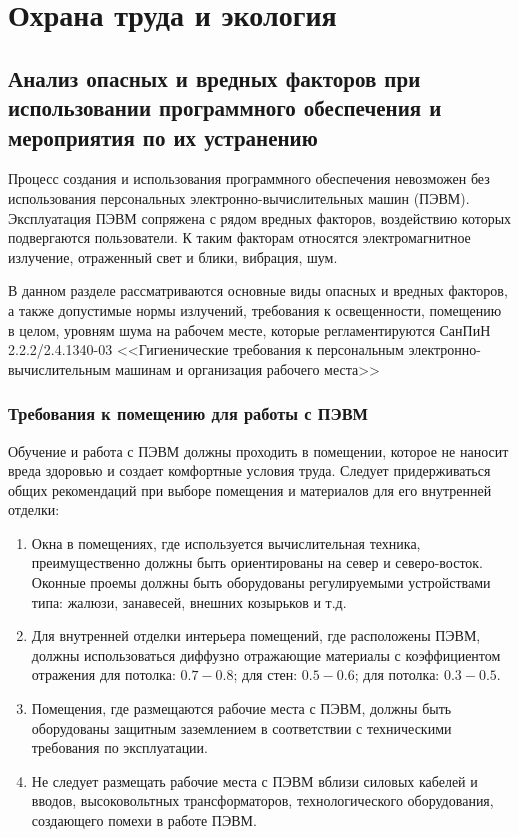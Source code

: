 \chapter{Охрана труда и экология}
\label{cha:ecolog}

\section{Анализ опасных и вредных факторов при использовании программного
	обеспечения и мероприятия по их устранению}
Процесс создания и использования программного обеспечения невозможен без использования
персональных электронно-вычислительных машин (ПЭВМ). Эксплуатация ПЭВМ
сопряжена с рядом вредных факторов, воздействию которых подвергаются
пользователи. К таким факторам относятся электромагнитное излучение,
отраженный свет и блики, вибрация, шум.

В данном разделе рассматриваются основные виды опасных и вредных факторов, а
также допустимые нормы излучений, требования к освещенности, помещению в
целом, уровням шума на рабочем месте, которые регламентируются СанПиН
2.2.2/2.4.1340-03 <<Гигиенические требования к персональным
электронно-вычислительным машинам и организация рабочего места>>

\subsection{Требования к помещению для работы с ПЭВМ}
Обучение и работа с ПЭВМ должны проходить в помещении, которое не наносит
вреда здоровью и создает комфортные условия труда. Следует придерживаться
общих рекомендаций при выборе помещения и материалов для его внутренней
отделки:
\begin{enumerate}
\item Окна в помещениях, где используется вычислительная техника,
	преимущественно должны быть ориентированы на север и северо-восток.
	Оконные проемы должны быть оборудованы регулируемыми устройствами
	типа: жалюзи, занавесей, внешних козырьков и т.д.

\item Для внутренней отделки интерьера помещений, где расположены ПЭВМ, должны
	использоваться диффузно отражающие материалы с коэффициентом отражения
	для потолка: $0.7 - 0.8$; для стен: $0.5 - 0.6$; для потолка: $0.3 -
	0.5$.
\item Помещения, где размещаются рабочие места с ПЭВМ, должны быть оборудованы
	защитным заземлением в соответствии с техническими требования по
	эксплуатации.
\item Не следует размещать рабочие места с ПЭВМ вблизи силовых кабелей и
	вводов, высоковольтных трансформаторов, технологического оборудования,
	создающего помехи в работе ПЭВМ.
\end{enumerate}

